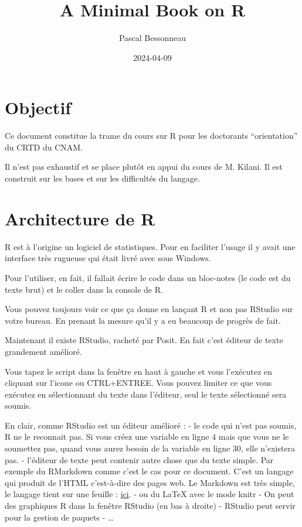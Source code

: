 \documentclass[
]{book}
\title{A Minimal Book on R}
\author{Pascal Bessonneau}
\date{2024-04-09}
\begin{document}
\maketitle

{
\setcounter{tocdepth}{1}
\tableofcontents
}
\hypertarget{objectif}{%
\chapter{Objectif}\label{objectif}}

Ce document constitue la trame du cours sur R pour les doctorants ``orientation''
du CRTD du CNAM.

Il n'est pas exhaustif et se place plutôt en appui du cours de M. Kilani. Il est
construit sur les bases et sur les difficultés du langage.

\hypertarget{architecture-de-r}{%
\chapter{Architecture de R}\label{architecture-de-r}}

R est à l'origine un logiciel de statistiques. Pour en faciliter l'usage il y
avait une interface très rugueuse qui était livré avec sous Windows.

Pour l'utiliser, en fait, il fallait écrire le code dans un bloc-notes (le code
est du texte brut) et le coller dans la console de R.

Vous pouvez toujours voir ce que ça donne en lançant R et non pas RStudio
sur votre bureau. En prenant la mesure qu'il y a eu beaucoup de progrès de fait.

Maintenant il existe RStudio, racheté par Posit. En fait c'est éditeur de texte
grandement amélioré.

Vous tapez le script dans la fenêtre en haut à gauche et vous l'exécutez en
cliquant sur l'icone ou CTRL+ENTREE. Vous pouvez limiter ce que vous exécutez
en sélectionnant du texte dans l'éditeur, seul le texte sélectionné sera soumis.

En clair, comme RStudio est un éditeur amélioré :
- le code qui n'est pas soumis, R ne le reconnait pas. Si vous créez une variable
en ligne 4 mais que vous ne le soumettez pas, quand vous aurez besoin de la
variable en ligne 30, elle n'existera pas.
- l'éditeur de texte peut contenir autre chose que du texte simple. Par exemple
du RMarkdown comme c'est le cas pour ce document. C'est un langage qui produit
de l'HTML c'est-à-dire des pages web. Le Markdown est très simple, le langage
tient sur une feuille : \href{https://www.markdownguide.org/cheat-sheet/}{ici}.
- ou du LaTeX avec le mode knitr
- On peut des graphiques R dans la fenêtre RStudio (en bas à droite)
- RStudio peut servir pour la gestion de paquets
- \ldots{}
\end{document}
